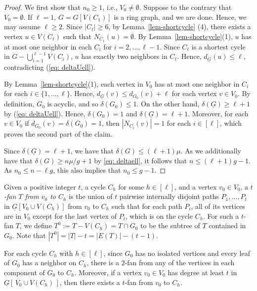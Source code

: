 \documentclass[12pt,oneside]{amsart}
\begin{document}
\begin{proof}
We first show that $n_0\geq 1$, i.e., $V_0 \ne \emptyset$. Suppose to the contrary that $V_0 = \emptyset$.  If $\ell =1$, $G=G[V(C_1)]$ is a ring graph, and we are done. Hence, we may assume $\ell\geq 2$. Since $|C_\ell| \ge 6$, by Lemma~\ref{lem-shortcycle} (4),  there exists a vertex  $u\in V(C_\ell)$ such that $N_{C_1}(u) = \emptyset$.   By Lemma~\ref{lem-shortcycle}(1), $u$ has at most one neighbor in each $C_i$ for $i=2, \dots, \ell -1$. Since $C_\ell$ is a shortest cycle in  $G-\bigcup_{i=1}^{\ell -1}V(C_i)$,  $u$  has exactly two neighbors in $C_\ell$. Hence,  $d_{\underline{G}}(u) \le \ell$, contradicting (\ref{eq: deltaUell}).

By Lemma~\ref{lem-shortcycle}(1), each vertex in $V_0$ has at most one neighbor in $C_i$ for each $i\in\{1, \dots, \ell\}$. Hence, $d_{\underline{G}}(v) \le d_{G_0}(v) +\ell$ for each vertex $v\in V_0$.
By definition,  $G_0$ is acyclic, and so $\delta(G_0) \le 1$.
On the other hand,  $\delta(\underline{G}) \ge \ell +1$ by (\ref{eq: deltaUell}). Hence, $\delta(G_0) =1$ and $\delta(\underline{G}) = \ell +1$. Moreover, for each $v\in V_0$ if $d_{G_0}(v) =\delta(G_0) =1$, then $|N_{C_i}(v)| =1$ for each $i\in [\ell]$, which proves the second part of the claim.

Since $\delta(\underline{G})=\ell+1$, we have that
$\delta(G)\leq (\ell+1)\mu$. As we additionally have that
$\delta(G) \ge n\mu/g +1$ by \eqref{eq: deltaell}, it follows that  $n  \le  (\ell +1)g-1$. As $n_0\leq n-\ell g$, this also implies that $n_0\leq g-1$.
\end{proof}

Given a positive integer $t$, a cycle $C_h$ for some $h \in [\ell]$, and a vertex $v_0 \in V_0$, a {\it  $t$-fan $T$ from $v_0$ to $C_h$} is the union of $t$ pairwise internally disjoint paths $P_1, \dots, P_t$ in $\underline{G}[V_0\cup V(C_h)]$ from $v_0$ to $C_h$ such that for each path $P_i$, all of its vertices are in $V_0$ except for the last vertex of $P_i$, which is on the cycle $C_h$.
For such a $t$-fan $T$, we define
\(T^0 := T - V(C_h) = T \cap G_0\)
to be the subtree of $T$ contained in $G_0$. Note that   $|T^0| = |T| -t= |E(T)|-(t-1)$.

For each cycle $C_h$ with $h \in [\ell]$, since $G_0$ has no isolated vertices and every leaf of $G_0$ has a neighbor on $C_h$,
there is a $2$-fan from any of the vertices in each component of $G_0$ to $C_h$.
Moreover, if a vertex $v_0 \in V_0$ has degree at least $t$ in $\underline{G}[\,V_0 \cup V(C_h)\,]$, then there exists a $t$-fan from $v_0$ to $C_h$.
\end{document}
